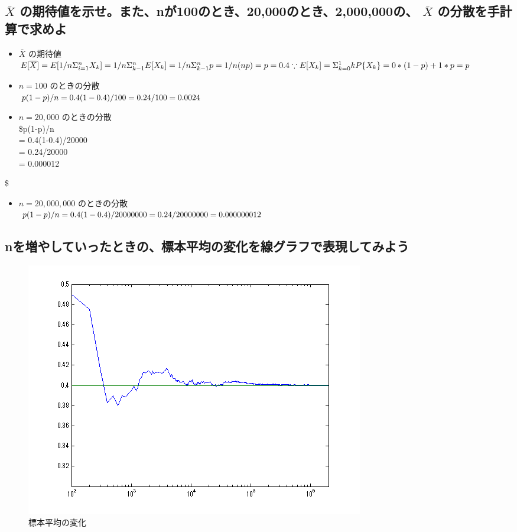 \documentclass{scrartcl}
\begin{document}
\subsection{\(\overline{X}\) の期待値を示せ。また、nが100のとき、20,000のとき、2,000,000の、 \(\overline{X}\) の分散を手計算で求めよ}
\label{sec:org2fe74c6}
\begin{itemize}
\item \(\overline{X}\) の期待値\\
\(E[\overline{X}] = E[1/n{\Sigma^{n}_{i=1}{X_k}}] \\
     = 1/n {\Sigma^{n}_{k-1}E[X_k]} \\
     = 1/n {\Sigma^{n}_{k-1}p}\\
     = 1/n (n p) \\
     = p \\
     = 0.4 \\
     \because
     E[X_k] = \Sigma_{k=0}^{1}kP\{X_k\} \\ 
     = 0 * (1-p) + 1 * p \\
     = p\)\\
\item \(n = 100\) のときの分散\\
\(p(1-p)/n 
     = 0.4(1-0.4)/100 \\
     = 0.24/100 \\
     = 0.0024\)\\
\item \(n = 20,000\) のときの分散\\
\$p(1-p)/n\\
= 0.4(1-0.4)/20000 \\
= 0.24/20000 \\
= 0.000012\\
\end{itemize}
\$\\
\begin{itemize}
\item \(n = 20,000,000\) のときの分散\\
\(p(1-p)/n
     = 0.4(1-0.4)/20000000 \\
     = 0.24/20000000 \\
     = 0.000000012\)          \\
\end{itemize}
\subsection{nを増やしていったときの、標本平均の変化を線グラフで表現してみよう}
\label{sec:org2db1f94}
\begin{figure}[htbp]
\centering
\includegraphics[width=0.5\linewidth]{./kadai/k2/k22.png}
\caption{標本平均の変化}
\end{figure}
\end{document}
